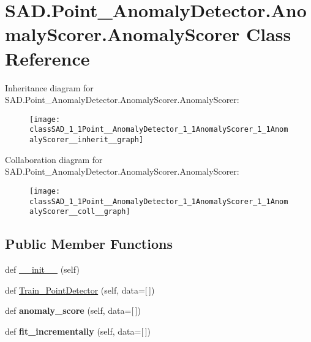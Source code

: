 \hypertarget{classSAD_1_1Point__AnomalyDetector_1_1AnomalyScorer_1_1AnomalyScorer}{}\section{S\+A\+D.\+Point\+\_\+\+Anomaly\+Detector.\+Anomaly\+Scorer.\+Anomaly\+Scorer Class Reference}
\label{classSAD_1_1Point__AnomalyDetector_1_1AnomalyScorer_1_1AnomalyScorer}


Inheritance diagram for S\+A\+D.\+Point\+\_\+\+Anomaly\+Detector.\+Anomaly\+Scorer.\+Anomaly\+Scorer\+:\nopagebreak
\begin{figure}[H]
\begin{center}
\leavevmode
\texttt{[image: classSAD\_1\_1Point\_\_AnomalyDetector\_1\_1AnomalyScorer\_1\_1AnomalyScorer\_\_inherit\_\_graph]}
\end{center}
\end{figure}


Collaboration diagram for S\+A\+D.\+Point\+\_\+\+Anomaly\+Detector.\+Anomaly\+Scorer.\+Anomaly\+Scorer\+:\nopagebreak
\begin{figure}[H]
\begin{center}
\leavevmode
\texttt{[image: classSAD\_1\_1Point\_\_AnomalyDetector\_1\_1AnomalyScorer\_1\_1AnomalyScorer\_\_coll\_\_graph]}
\end{center}
\end{figure}
\subsection*{Public Member Functions}
\begin{DoxyCompactItemize}
\item 
def \hyperlink{classSAD_1_1Point__AnomalyDetector_1_1AnomalyScorer_1_1AnomalyScorer_a4109f8186ad1aa9c28c2f12fcc36c714}{\+\_\+\+\_\+init\+\_\+\+\_\+} (self)
\item 
def \hyperlink{classSAD_1_1Point__AnomalyDetector_1_1AnomalyScorer_1_1AnomalyScorer_a22e40f7116e20bd61b81510970266151}{Train\+\_\+\+Point\+Detector} (self, data=\mbox{[}$\,$\mbox{]})
\item 
def {\bfseries anomaly\+\_\+score} (self, data=\mbox{[}$\,$\mbox{]})\hypertarget{classSAD_1_1Point__AnomalyDetector_1_1AnomalyScorer_1_1AnomalyScorer_a534fddddf6e7535e84e75eb484735ce4}{}\label{classSAD_1_1Point__AnomalyDetector_1_1AnomalyScorer_1_1AnomalyScorer_a534fddddf6e7535e84e75eb484735ce4}

\item 
def {\bfseries fit\+\_\+incrementally} (self, data=\mbox{[}$\,$\mbox{]})\hypertarget{classSAD_1_1Point__AnomalyDetector_1_1AnomalyScorer_1_1AnomalyScorer_ad548d5a669559ec4db2711b0328d5d17}{}\label{classSAD_1_1Point__AnomalyDetector_1_1AnomalyScorer_1_1AnomalyScorer_ad548d5a669559ec4db2711b0328d5d17}

\end{DoxyCompactItemize}



